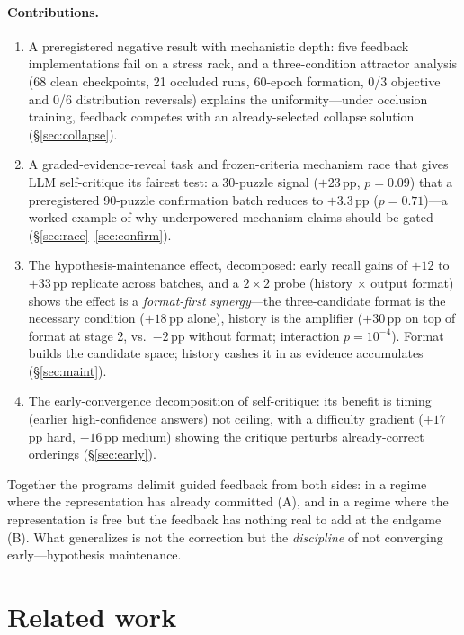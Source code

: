 \documentclass[10pt]{article}
\begin{document}
\paragraph{Contributions.}
\begin{enumerate}
\item A preregistered negative result with mechanistic depth: five feedback
  implementations fail on a stress rack, and a three-condition attractor
  analysis (68 clean checkpoints, 21 occluded runs, 60-epoch formation,
  0/3 objective and 0/6 distribution reversals) explains the
  uniformity---under occlusion training, feedback competes with an
  already-selected collapse solution (\S\ref{sec:collapse}).
\item A graded-evidence-reveal task and frozen-criteria mechanism race that
  gives LLM self-critique its fairest test: a 30-puzzle signal
  ($+23$\,pp, $p = 0.09$) that a preregistered 90-puzzle confirmation batch
  reduces to $+3.3$\,pp ($p = 0.71$)---a worked example of why
  underpowered mechanism claims should be gated
  (\S\ref{sec:race}--\ref{sec:confirm}).
\item The hypothesis-maintenance effect, decomposed: early recall gains
  of $+12$ to $+33$\,pp replicate across batches, and a $2\times2$ probe
  (history $\times$ output format) shows the effect is a
  \emph{format-first synergy}---the three-candidate format is the
  necessary condition ($+18$\,pp alone), history is the amplifier
  ($+30$\,pp on top of format at stage 2, vs.\ $-2$\,pp without format;
  interaction $p = 10^{-4}$). Format builds the candidate space; history
  cashes it in as evidence accumulates (\S\ref{sec:maint}).
\item The early-convergence decomposition of self-critique: its benefit is
  timing (earlier high-confidence answers) not ceiling, with a difficulty
  gradient ($+17$\,pp hard, $-16$\,pp medium) showing the critique perturbs
  already-correct orderings (\S\ref{sec:early}).
\end{enumerate}

Together the programs delimit guided feedback from both sides: in a regime
where the representation has already committed (A), and in a regime where
the representation is free but the feedback has nothing real to add at the
endgame (B). What generalizes is not the correction but the
\emph{discipline} of not converging early---hypothesis maintenance.

\section{Related work}
\label{sec:related}
\end{document}
